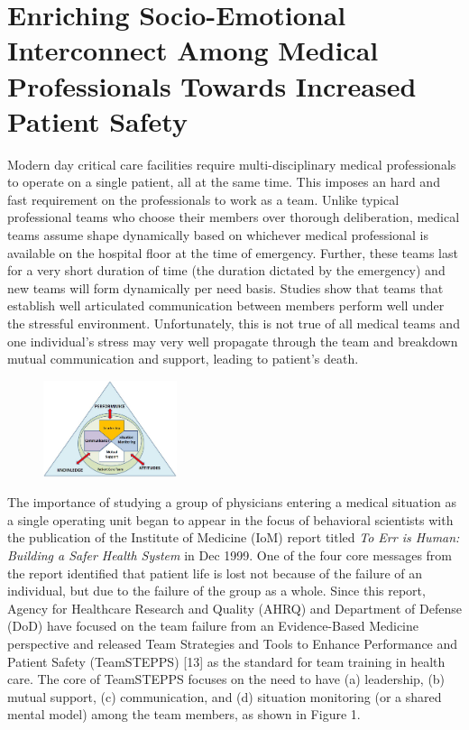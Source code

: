 \documentclass{article} %
\begin{document}
\section{Enriching Socio-Emotional Interconnect Among Medical Professionals Towards Increased Patient Safety} \label{Sec:Medical}
\vspace{-0.13in}
Modern day critical care facilities require multi-disciplinary medical professionals to operate on a single patient, all at the same time. This imposes an hard and fast requirement on the professionals to work as a team. Unlike typical professional teams who choose their members over thorough deliberation, medical teams assume shape dynamically based on whichever medical professional is available on the hospital floor at the time of emergency. Further, these teams last for a very short duration of time (the duration dictated by the emergency) and new teams will form dynamically per need basis. Studies show that teams that establish well articulated communication between members perform well  under the stressful environment. Unfortunately, this is not true of all medical teams and one individual's stress may very well propagate through the team and breakdown mutual communication and support, leading to patient's death. 

\begin{figure}
	\vspace{-20pt}
  \begin{center}
    \includegraphics[width=0.35\textwidth]{TeamStepps.jpg}
  \end{center}
\vspace{-0.2in}
  \caption{}
\vspace{-0.1in}
  \label{fig_cp}
\end{figure} 

The importance of studying a group of physicians entering a medical situation as a single operating unit began to appear in the focus of behavioral scientists with the publication of the Institute of Medicine (IoM) report titled \emph{To Err is Human: Building a Safer Health System} in Dec 1999. One of the four core messages from the report identified that patient life is lost not because of the failure of an individual, but due to the failure of the group as a whole. Since this report, Agency for Healthcare Research and Quality (AHRQ) and Department of Defense (DoD) have focused on the team failure from an Evidence-Based Medicine perspective and released Team Strategies and Tools to Enhance Performance and Patient Safety (TeamSTEPPS) [13] as the standard for team training in health care. The core of TeamSTEPPS focuses on the need to have (a) leadership, (b) mutual support, (c) communication, and (d) situation monitoring (or a shared mental model) among the team members, as shown in Figure 1.
\end{document}
